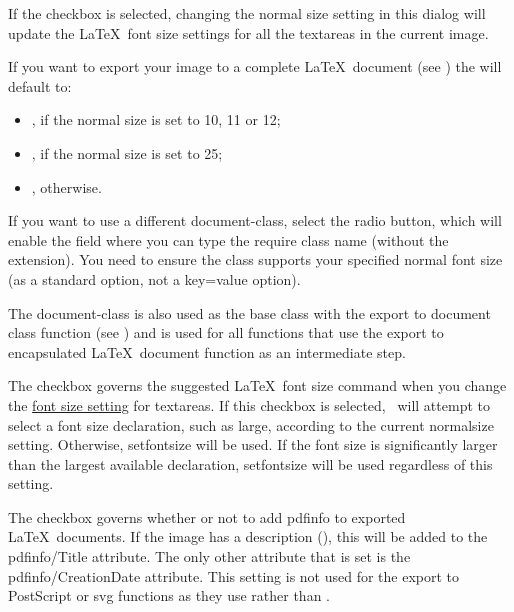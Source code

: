 
If the  \gls*{checkbox} is selected,
changing the normal size setting in this dialog will update the
\LaTeX\ font size settings for all the \glspl{textarea} in the
current image.


If you want to export your image to a complete \LaTeX\ document (see
) the  will default to:
\begin{itemize}
\item {}, if the normal size is
set to 10, 11 or 12;
\item {}, if the normal size is set to
25;
\item {}, otherwise.
\end{itemize}


If you want to use a different \gls{document-class}, select the
 radio button, which will enable the
field where you can type the require class name (without the
 extension). You need to ensure the class supports your
specified normal font size (as a standard option, not a key=value
option).

The \gls{document-class} is also used as the base class with the export to
document class function (see ) and is used
for all  functions that use the export to encapsulated \LaTeX\
document function as an intermediate step.


The  \gls*{checkbox} governs
the suggested \LaTeX\ font size command when you change the
\hyperref[sec:fontsize]{font size setting} for \glspl{textarea}. If
this \gls*{checkbox} is selected, \FlowframTk\ will attempt to select a
font size declaration, such as \gls{large}, according to the current
normalsize setting. Otherwise, \gls{setfontsize} will be used. If
the font size is significantly larger than the largest available
declaration, \gls{setfontsize} will be used regardless of this
setting.


The  \gls*{checkbox} governs whether or
not to add \gls{pdfinfo} to exported \LaTeX\ documents. If the image
has a description (\sectionref{sec:imagedescription}), this will be
added to the \gls{pdfinfo/Title} attribute. The only other attribute
that is set is the \gls{pdfinfo/CreationDate} attribute. This setting is
not used for the export to PostScript or \gls{svg} functions as they
use \app{latex} rather than \app{pdflatex}.

